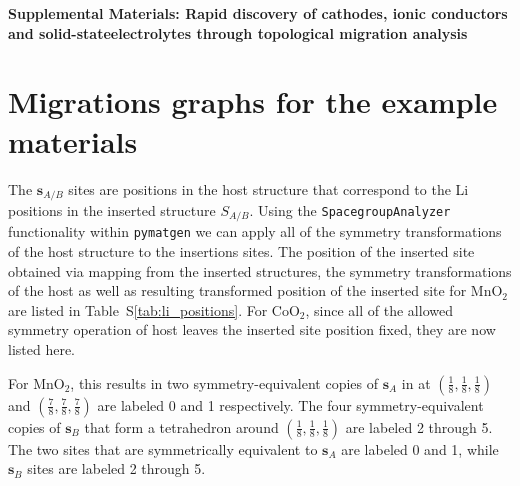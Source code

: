 \documentclass[reprint,preprintnumbers,amsmath,amssymb,aps,prl]{revtex4-1}
\begin{document}




\pagebreak
\widetext
\begin{center}
    \textbf{\large Supplemental Materials: Rapid discovery of cathodes, ionic conductors and solid-stateelectrolytes through topological migration analysis}
\end{center}


\setcounter{equation}{0}
\setcounter{figure}{0}
\setcounter{table}{0}
\setcounter{page}{1}
\makeatletter
\renewcommand{\theequation}{S\arabic{equation}}
\renewcommand{\thefigure}{S\arabic{figure}}
\renewcommand{\bibnumfmt}[1]{[S#1]}
\renewcommand{\citenumfont}[1]{S#1}


\section{Migrations graphs for the example materials}

The $\bm{s}_{A/B}$ sites are positions in the host structure that correspond to the Li positions in the inserted structure $S_{A/B}$.
Using the \texttt{SpacegroupAnalyzer} functionality within \texttt{pymatgen} we can apply all of the symmetry transformations of the host structure to the insertions sites.
The position of the inserted site obtained via mapping from the inserted structures, the symmetry transformations of the host as well as resulting transformed position of the inserted site for MnO$_2$ are listed in Table~S\ref{tab:li_positions}.
For CoO$_2$, since all of the allowed symmetry operation of host leaves the inserted site position fixed, they are now listed here.

For MnO$_2$, this results in two symmetry-equivalent copies of $\bm{s}_{A}$ in at $\left(\frac{1}{8},\frac{1}{8},\frac{1}{8}\right)$ and $\left(\frac{7}{8},\frac{7}{8},\frac{7}{8}\right)$ are labeled 0 and 1 respectively.
The four symmetry-equivalent copies of $\bm{s}_{B}$ that form a tetrahedron around $\left(\frac{1}{8},\frac{1}{8},\frac{1}{8}\right)$ are labeled 2 through 5.
The two sites that are symmetrically equivalent to $\bm{s}_{A}$ are labeled 0 and 1, while $\bm{s}_{B}$ sites are labeled 2 through 5.
\end{document}
